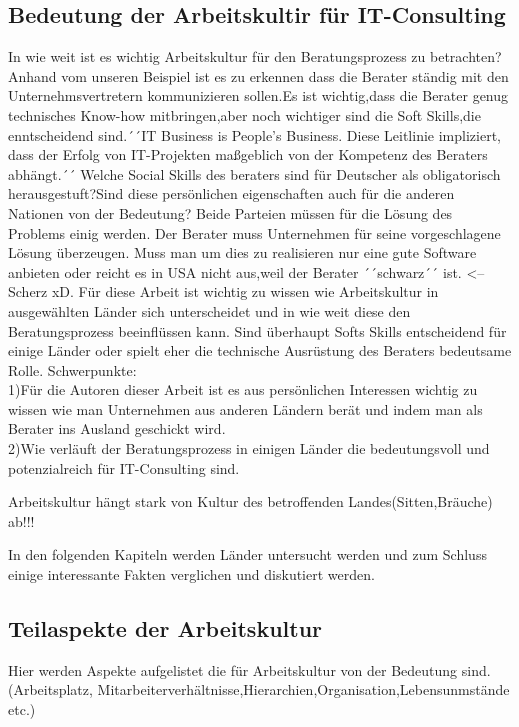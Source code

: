 	\subsection{Bedeutung der Arbeitskultir für IT-Consulting}
In wie weit ist es wichtig Arbeitskultur für den Beratungsprozess zu betrachten? Anhand vom unseren Beispiel ist es zu erkennen dass die Berater ständig mit den Unternehmsvertretern kommunizieren sollen.Es ist wichtig,dass die Berater genug technisches Know-how mitbringen,aber noch wichtiger sind die Soft Skills,die enntscheidend sind.´´IT Business is People's Business. Diese Leitlinie impliziert, dass der Erfolg von IT-Projekten maßgeblich von der Kompetenz des Beraters abhängt.´´
 Welche Social Skills des beraters sind für Deutscher als obligatorisch herausgestuft?Sind diese persönlichen eigenschaften auch für die anderen Nationen von der Bedeutung? Beide Parteien müssen für die Lösung des Problems einig werden. Der Berater muss Unternehmen für seine vorgeschlagene Lösung überzeugen. Muss man um dies zu realisieren nur eine gute Software anbieten oder reicht es in USA nicht aus,weil der Berater ´´schwarz´´ ist. <-- Scherz xD. Für diese Arbeit ist wichtig zu wissen wie Arbeitskultur in ausgewählten Länder sich unterscheidet und in wie weit diese den Beratungsprozess beeinflüssen kann. 
Sind überhaupt Softs Skills entscheidend für einige Länder oder spielt eher die technische Ausrüstung des Beraters bedeutsame Rolle.
Schwerpunkte:\\
1)Für die Autoren dieser Arbeit ist es aus persönlichen Interessen wichtig zu wissen wie man Unternehmen aus anderen Ländern berät und indem man als Berater ins Ausland geschickt wird.\\
2)Wie verläuft der Beratungsprozess in einigen Länder die bedeutungsvoll und potenzialreich für IT-Consulting sind.

Arbeitskultur hängt stark von Kultur des betroffenden Landes(Sitten,Bräuche) ab!!!

In den folgenden Kapiteln werden Länder untersucht werden und zum Schluss einige interessante Fakten verglichen und diskutiert werden. 

\subsection{Teilaspekte der Arbeitskultur}
Hier werden Aspekte aufgelistet die für Arbeitskultur von der Bedeutung sind.(Arbeitsplatz, Mitarbeiterverhältnisse,Hierarchien,Organisation,Lebensunmstände etc.)

